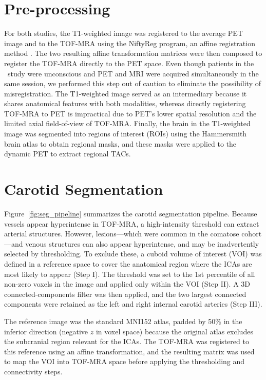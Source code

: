 \section{Pre-processing}
For both studies, the T1-weighted image was registered to the average PET image and to the TOF-MRA using the NiftyReg program, an affine registration method \cite{TODO}.
The two resulting affine transformation matrices were then composed to register the TOF-MRA directly to the PET space.
Even though patients in the \fdg\ study were unconscious and PET and MRI were acquired simultaneously in the same session, we performed this step out of caution to eliminate the possibility of misregistration.
The T1-weighted image served as an intermediary because it shares anatomical features with both modalities, whereas directly registering TOF-MRA to PET is impractical due to PET’s lower spatial resolution and the limited axial field-of-view of TOF-MRA.
Finally, the brain in the T1-weighted image was segmented into regions of interest (ROIs) using the Hammersmith brain atlas \cite{hammers2003three} to obtain regional masks, and these masks were applied to the dynamic PET to extract regional TACs.


\section{Carotid Segmentation\label{sec:carotid}}
Figure~\ref{fig:seg_pipeline} summarizes the carotid segmentation pipeline.
Because vessels appear hyperintense in TOF-MRA, a high-intensity threshold can extract arterial structures.
However, lesions—which were common in the comatose cohort—and venous structures can also appear hyperintense, and may be inadvertently selected by thresholding.
To exclude these, a cuboid volume of interest (VOI) was defined in a reference space to cover the anatomical region where the ICAs are most likely to appear (Step I).
The threshold was set to the 1st percentile of all non-zero voxels in the image and applied only within the VOI (Step II).
A 3D connected-components filter was then applied, and the two largest connected components were retained as the left and right internal carotid arteries (Step III).

The reference image was the standard MNI152 atlas, padded by 50\% in the inferior direction (negative \(z\) in voxel space) because the original atlas excludes the subcranial region relevant for the ICAs.
The TOF-MRA was registered to this reference using an affine transformation, and the resulting matrix was used to map the VOI into TOF-MRA space before applying the thresholding and connectivity steps.

